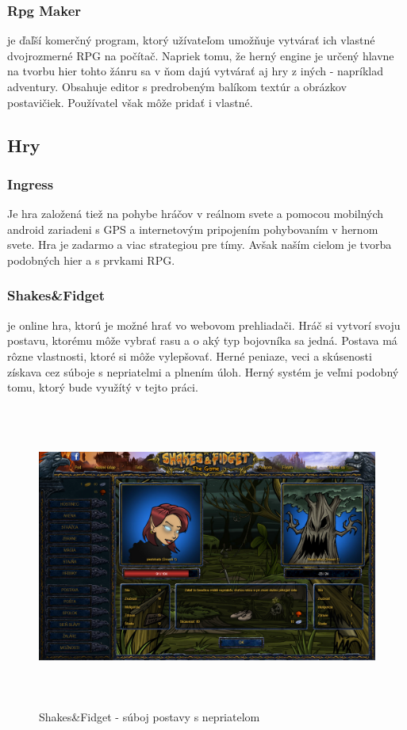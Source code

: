 \subsubsection{Rpg Maker} je ďaľší komerčný program, ktorý užívateľom umožňuje vytvárať ich vlastné dvojrozmerné RPG na počítač. Napriek tomu, že herný engine je určený hlavne na tvorbu hier tohto žánru sa v ňom dajú vytvárať aj hry z iných - napríklad adventury\cite{rpg-maker-game}. Obsahuje editor s predrobeným balíkom textúr a obrázkov postavičiek. Používatel však môže pridať i vlastné. 
\cite{rpg-maker}

\subsection{Hry}
\subsubsection{Ingress} Je hra založená tiež na pohybe hráčov v reálnom svete a pomocou mobilných android zariadeni s GPS a internetovým pripojením pohybovaním v hernom svete. Hra je zadarmo a viac strategiou pre tímy. Avšak naším cielom je tvorba podobných hier a s prvkami RPG.


\subsubsection{Shakes\&Fidget} je online hra, ktorú je možné hrať vo webovom prehliadači\cite{sfgame}. Hráč si vytvorí svoju postavu, ktorému môže vybrať rasu a o aký typ bojovníka sa jedná. Postava má rôzne vlastnosti, ktoré si môže vylepšovať. Herné peniaze, veci a skúsenosti získava cez súboje s nepriatelmi a plnením úloh. Herný systém je veľmi podobný tomu, ktorý bude využítý v tejto práci.

\begin{figure}
  \centering
  \includegraphics[height=10cm]{mainmatter/imgs/shakes.png}
  \caption{Shakes\&Fidget - súboj postavy s nepriatelom}
  \label{fig:comenius}
\end{figure}


